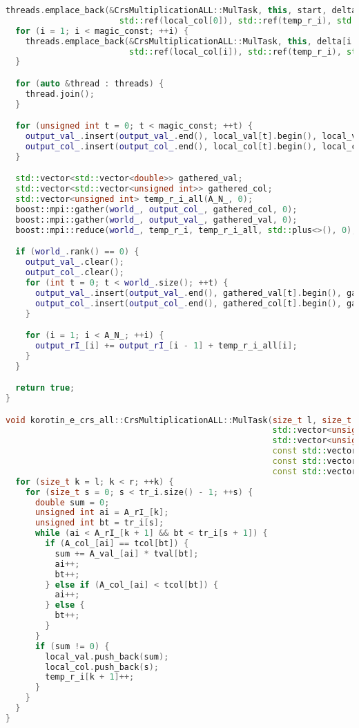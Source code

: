 \documentclass[a4paper,12pt]{article}
\begin{document}
\begin{lstlisting}[language=C++]
  threads.emplace_back(&CrsMultiplicationALL::MulTask, this, start, delta[0], std::ref(local_val[0]),
                       std::ref(local_col[0]), std::ref(temp_r_i), std::ref(tr_i), std::ref(tcol), std::ref(tval));
  for (i = 1; i < magic_const; ++i) {
    threads.emplace_back(&CrsMultiplicationALL::MulTask, this, delta[i - 1], delta[i], std::ref(local_val[i]),
                         std::ref(local_col[i]), std::ref(temp_r_i), std::ref(tr_i), std::ref(tcol), std::ref(tval));
  }

  for (auto &thread : threads) {
    thread.join();
  }

  for (unsigned int t = 0; t < magic_const; ++t) {
    output_val_.insert(output_val_.end(), local_val[t].begin(), local_val[t].end());
    output_col_.insert(output_col_.end(), local_col[t].begin(), local_col[t].end());
  }

  std::vector<std::vector<double>> gathered_val;
  std::vector<std::vector<unsigned int>> gathered_col;
  std::vector<unsigned int> temp_r_i_all(A_N_, 0);
  boost::mpi::gather(world_, output_col_, gathered_col, 0);
  boost::mpi::gather(world_, output_val_, gathered_val, 0);
  boost::mpi::reduce(world_, temp_r_i, temp_r_i_all, std::plus<>(), 0);

  if (world_.rank() == 0) {
    output_val_.clear();
    output_col_.clear();
    for (int t = 0; t < world_.size(); ++t) {
      output_val_.insert(output_val_.end(), gathered_val[t].begin(), gathered_val[t].end());
      output_col_.insert(output_col_.end(), gathered_col[t].begin(), gathered_col[t].end());
    }

    for (i = 1; i < A_N_; ++i) {
      output_rI_[i] += output_rI_[i - 1] + temp_r_i_all[i];
    }
  }

  return true;
}

void korotin_e_crs_all::CrsMultiplicationALL::MulTask(size_t l, size_t r, std::vector<double> &local_val,
                                                      std::vector<unsigned int> &local_col,
                                                      std::vector<unsigned int> &temp_r_i,
                                                      const std::vector<unsigned int> &tr_i,
                                                      const std::vector<unsigned int> &tcol,
                                                      const std::vector<double> &tval) {
  for (size_t k = l; k < r; ++k) {
    for (size_t s = 0; s < tr_i.size() - 1; ++s) {
      double sum = 0;
      unsigned int ai = A_rI_[k];
      unsigned int bt = tr_i[s];
      while (ai < A_rI_[k + 1] && bt < tr_i[s + 1]) {
        if (A_col_[ai] == tcol[bt]) {
          sum += A_val_[ai] * tval[bt];
          ai++;
          bt++;
        } else if (A_col_[ai] < tcol[bt]) {
          ai++;
        } else {
          bt++;
        }
      }
      if (sum != 0) {
        local_val.push_back(sum);
        local_col.push_back(s);
        temp_r_i[k + 1]++;
      }
    }
  }
}


\end{lstlisting}
\end{document}
